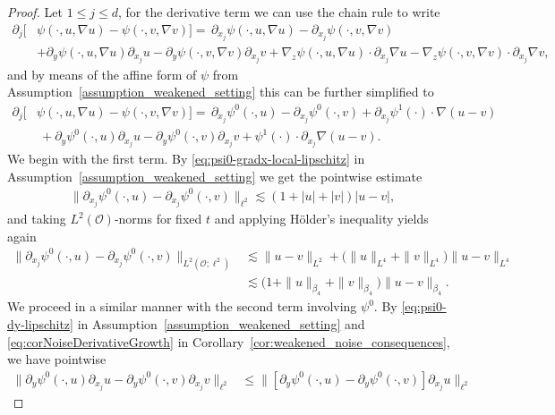 \documentclass[reqno]{amsart}
\newcommand{\sO}{\mathscr{O}}
\newcommand{\1}{\mathbf{1}}
\begin{document}
\begin{proof}
Let $1\leq j\leq d$, for the derivative term we can use the chain rule to write 
\begin{align*}
    \partial_j [&\psi(\cdot,u,\nabla u)-\psi(\cdot,v,\nabla v)]=\, \partial_{x_j}\psi(\cdot,u,\nabla u)-\partial_{x_j}\psi(\cdot,v,\nabla v)\\
    & + \partial_y \psi(\cdot,u,\nabla u)\partial_{x_j}u-\partial_y \psi(\cdot,v,\nabla v)\partial_{x_j}v
    + \nabla_z \psi(\cdot,u,\nabla u)\cdot \partial_{x_j}\nabla u-\nabla_z\psi(\cdot,v,\nabla v)\cdot\partial_{x_j} \nabla v,
\end{align*}
and by means of the affine form of $\psi$ from Assumption~\ref{assumption_weakened_setting} this can be further simplified to
\begin{align*}
    \partial_j [&\psi(\cdot,u,\nabla u)-\psi(\cdot,v,\nabla v)]=\, 
 \partial_{x_j}\psi^0(\cdot,u)-\partial_{x_j}\psi^0(\cdot,v)
     + \partial_{x_j}\psi^1(\cdot)\cdot \nabla(u-v)\\
    &\ + \partial_y\psi^0(\cdot,u)\partial_{x_j}u
    -\partial_y\psi^0(\cdot,v)\partial_{x_j}v
     + \psi^1(\cdot)\cdot \partial_{x_j}\nabla(u-v).
\end{align*}
We begin with the first term. By \eqref{eq:psi0-gradx-local-lipschitz} in Assumption~\ref{assumption_weakened_setting} we get the pointwise estimate
\begin{align*}
    \|\partial_{x_j}\psi^0(\cdot,u)
    -\partial_{x_j}\psi^0(\cdot,v)\|_{\ell^2}
    \lesssim (1+|u|+|v|)|u-v|,
\end{align*}
and taking $L^2(\sO)$-norms for fixed $t$ and applying Hölder's inequality yields again
\begin{align*}
    \|\partial_{x_j}\psi^0(\cdot,u)
    -\partial_{x_j}\psi^0(\cdot,v)\|_{L^2(\sO;\ell^2)}
    &\lesssim
    \|u-v\|_{L^2}
    +\bigl(\|u\|_{L^4}+\|v\|_{L^4}\bigr)
    \|u-v\|_{L^4}
    \\
    &\lesssim
    \bigl(1+\|u\|_{\beta_4}+\|v\|_{\beta_4}\bigr)
    \|u-v\|_{\beta_4}.
\end{align*}
We proceed in a similar manner with the second term involving $\psi^0$. By \eqref{eq:psi0-dy-lipschitz} in Assumption~\ref{assumption_weakened_setting} and \eqref{eq:corNoiseDerivativeGrowth} in Corollary~\ref{cor:weakened_noise_consequences}, we have pointwise 
\begin{align*}
     \|\partial_{y}\psi^0(\cdot,u)\partial_{x_j}u
     -\partial_{y}\psi^0(\cdot,v)\partial_{x_j}v \|_{\ell^2}
   &\leq  \| [\partial_{y}\psi^0(\cdot,u)-\partial_{y}\psi^0(\cdot,v)]
   \partial_{x_j}u \|_{\ell^2}

\end{align*}
\end{proof}
\end{document}
